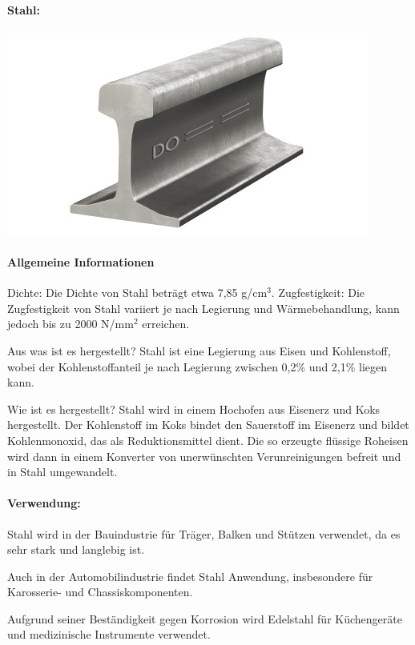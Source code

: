 \documentclass{article}
\begin{document}
\clearpage

\newpage
\pagestyle{fancy}
\fancyhf{}

\begin{multicols}{3}

\paragraph{Stahl:}
\includegraphics[width=\linewidth]{stahl.jpg}
\paragraph{Allgemeine Informationen}
Dichte: Die Dichte von Stahl beträgt etwa 7,85 g/cm$^3$. Zugfestigkeit: Die
Zugfestigkeit von Stahl variiert je nach Legierung und Wärmebehandlung, kann
jedoch bis zu 2000 N/mm$^2$ erreichen.

Aus was ist es hergestellt? Stahl ist eine Legierung aus Eisen und Kohlenstoff,
wobei der Kohlenstoffanteil je nach Legierung zwischen 0,2\% und 2,1\% liegen
kann.

Wie ist es hergestellt? Stahl wird in einem Hochofen aus Eisenerz und Koks
hergestellt. Der Kohlenstoff im Koks bindet den Sauerstoff im Eisenerz und
bildet Kohlenmonoxid, das als Reduktionsmittel dient. Die so erzeugte flüssige
Roheisen wird dann in einem Konverter von unerwünschten Verunreinigungen
befreit und in Stahl umgewandelt.

\paragraph{Verwendung:}
\begin{compactitem}
\item Stahl wird in der Bauindustrie für Träger, Balken und Stützen verwendet,
  da es sehr stark und langlebig ist.
\item Auch in der Automobilindustrie findet Stahl Anwendung, insbesondere für
  Karosserie- und Chassiskomponenten.
\item Aufgrund seiner Beständigkeit gegen Korrosion wird Edelstahl für
  Küchengeräte und medizinische Instrumente verwendet.
\end{compactitem}


\end{multicols}
\end{document}
